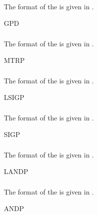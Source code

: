 \subsubsection{}\label{sec:GPDBlock}
The format of the  is given in .
\begin{BlockTable}{GPD}
  \label{tab:GPDBlock}
\end{BlockTable}

\subsubsection{}\label{sec:MTRPBlock}
The format of the  is given in .
\begin{BlockTable}{MTRP}
  \label{tab:MTRPBlock}
\end{BlockTable}

\subsubsection{}\label{sec:LSIGPBlock}
The format of the  is given in .
\begin{BlockTable}{LSIGP}
  \label{tab:LSIGPBlock}
\end{BlockTable}

\subsubsection{}\label{sec:SIGPBlock}
The format of the  is given in .
\begin{BlockTable}{SIGP}
  \label{tab:SIGPBlock}
\end{BlockTable}

\subsubsection{}\label{sec:LANDPBlock}
The format of the  is given in .
\begin{BlockTable}{LANDP}
  \label{tab:LANDPBlock}
\end{BlockTable}

\subsubsection{}\label{sec:ANDPBlock}
The format of the  is given in .
\begin{BlockTable}{ANDP}
  \label{tab:ANDPBlock}
\end{BlockTable}

